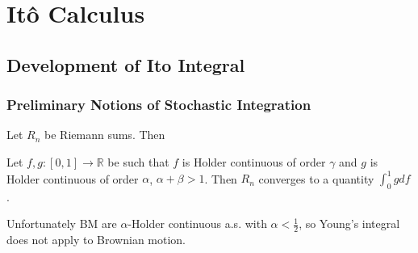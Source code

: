
\section{Itô Calculus}

\subsection{Development of Ito Integral}

\subsubsection{Preliminary Notions of Stochastic Integration}






Let $R_n$ be Riemann sums. Then

\begin{definition}
	Let $f, g: [0,1] \to \mathbb{R}$ be such that $f$ is Holder continuous of order $\gamma$ and $g$ is Holder continuous of order $\alpha$, $\alpha + \beta > 1$. Then $R_n$ converges to a quantity $\int _0^1 g d f$.
\end{definition}

Unfortunately BM are $\alpha$-Holder continuous a.s. with $\alpha < \frac{1}{2}$, so Young's integral does not apply to Brownian motion.


